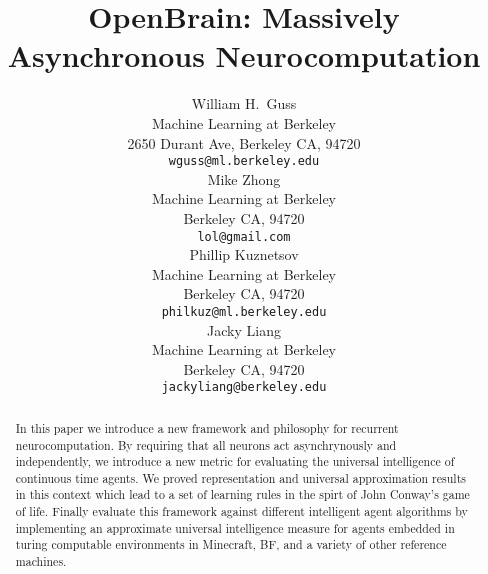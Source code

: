 \documentclass{article} %
\title{OpenBrain: Massively Asynchronous Neurocomputation}
\author{
William H.~Guss \\
Machine Learning at Berkeley\\
2650 Durant Ave, Berkeley CA, 94720 \\
\texttt{wguss@ml.berkeley.edu} \\
\And
Mike Zhong \\
Machine Learning at Berkeley \\
Berkeley CA, 94720 \\
\texttt{lol@gmail.com} \\
\And
Phillip Kuznetsov \\
Machine Learning at Berkeley \\
Berkeley CA, 94720 \\
\texttt{philkuz@ml.berkeley.edu} \\
\And
Jacky Liang \\
Machine Learning at Berkeley \\
Berkeley CA, 94720 \\
\texttt{jackyliang@berkeley.edu} \\
}
\numberwithin{equation}{subsection}
\numberwithin{theorem}{subsection}
\begin{document}
\maketitle

\begin{abstract}
	In this paper we introduce a new framework and philosophy for recurrent neurocomputation. By requiring that all neurons act asynchrynously and independently, we introduce a new metric for evaluating the universal intelligence of continuous time agents. We proved representation and universal approximation results in this context which lead to a set of learning rules in the spirt of John Conway's game of life. Finally evaluate this framework against different intelligent agent algorithms by implementing an approximate universal intelligence measure for agents embedded in turing computable environments in Minecraft, BF, and a variety of other reference machines.
\end{abstract}








\printbibliography


\end{document}

